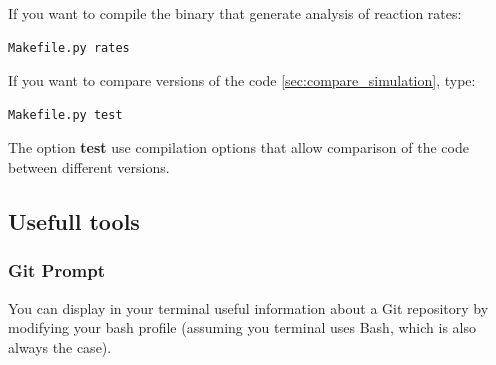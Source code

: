 \documentclass[english,a4paper,twoside]{article}
\begin{document}
If you want to compile the binary  that generate analysis of reaction rates:
\begin{verbatim}
Makefile.py rates
\end{verbatim}

If you want to compare versions of the code \ref{sec:compare_simulation}, type:
\begin{verbatim}
Makefile.py test
\end{verbatim}
The option \textbf{test} use compilation options that allow comparison of the code between different versions. 

\subsection{Usefull tools}
\subsubsection{Git Prompt}
You can display in your terminal useful information about a Git repository by modifying your bash profile (assuming you terminal uses Bash, which is also always the case).
\end{document}
